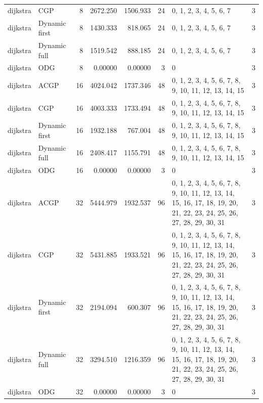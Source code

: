 \documentclass[10pt,a4paper]{article}
\begin{document}
\begin{longtable}{@{}p{23mm}p{29mm}rrrrp{36mm}r@{}}
dijkstra & CGP & 8 & 2672.250 & 1506.933 & 24 & 0, 1, 2, 3, 4, 5, 6, 7 & 3 \\
dijkstra & Dynamic first & 8 & 1430.333 & 818.065 & 24 & 0, 1, 2, 3, 4, 5, 6, 7 & 3 \\
dijkstra & Dynamic full & 8 & 1519.542 & 888.185 & 24 & 0, 1, 2, 3, 4, 5, 6, 7 & 3 \\
dijkstra & ODG & 8 & 0.00000 & 0.00000 & 3 & 0 & 3 \\
dijkstra & ACGP & 16 & 4024.042 & 1737.346 & 48 & 0, 1, 2, 3, 4, 5, 6, 7, 8, 9, 10, 11, 12, 13, 14, 15 & 3 \\
dijkstra & CGP & 16 & 4003.333 & 1733.494 & 48 & 0, 1, 2, 3, 4, 5, 6, 7, 8, 9, 10, 11, 12, 13, 14, 15 & 3 \\
dijkstra & Dynamic first & 16 & 1932.188 & 767.004 & 48 & 0, 1, 2, 3, 4, 5, 6, 7, 8, 9, 10, 11, 12, 13, 14, 15 & 3 \\
dijkstra & Dynamic full & 16 & 2408.417 & 1155.791 & 48 & 0, 1, 2, 3, 4, 5, 6, 7, 8, 9, 10, 11, 12, 13, 14, 15 & 3 \\
dijkstra & ODG & 16 & 0.00000 & 0.00000 & 3 & 0 & 3 \\
dijkstra & ACGP & 32 & 5444.979 & 1932.537 & 96 & 0, 1, 2, 3, 4, 5, 6, 7, 8, 9, 10, 11, 12, 13, 14, 15, 16, 17, 18, 19, 20, 21, 22, 23, 24, 25, 26, 27, 28, 29, 30, 31 & 3 \\
dijkstra & CGP & 32 & 5431.885 & 1933.521 & 96 & 0, 1, 2, 3, 4, 5, 6, 7, 8, 9, 10, 11, 12, 13, 14, 15, 16, 17, 18, 19, 20, 21, 22, 23, 24, 25, 26, 27, 28, 29, 30, 31 & 3 \\
dijkstra & Dynamic first & 32 & 2194.094 & 600.307 & 96 & 0, 1, 2, 3, 4, 5, 6, 7, 8, 9, 10, 11, 12, 13, 14, 15, 16, 17, 18, 19, 20, 21, 22, 23, 24, 25, 26, 27, 28, 29, 30, 31 & 3 \\
dijkstra & Dynamic full & 32 & 3294.510 & 1216.359 & 96 & 0, 1, 2, 3, 4, 5, 6, 7, 8, 9, 10, 11, 12, 13, 14, 15, 16, 17, 18, 19, 20, 21, 22, 23, 24, 25, 26, 27, 28, 29, 30, 31 & 3 \\
dijkstra & ODG & 32 & 0.00000 & 0.00000 & 3 & 0 & 3 \\
\end{longtable}\normalsize\setlength{\tabcolsep}{6pt}
\clearpage
\end{document}
